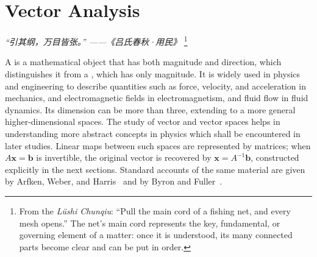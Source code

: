 \chapter{Vector Analysis}
\renewcommand{\currentchapterpath}{chapters/vec/}

\begin{flushright}
\textit{“引其纲，万目皆张。” ——《吕氏春秋·用民》}
\footnote{From the \textit{Lüshi Chunqiu}: 
``Pull the main cord of a fishing net, and every mesh opens.'' 
The net's main cord represents the key, fundamental, 
or governing element of a matter: once it is understood, 
its many connected parts become clear and can be put in order.}
\end{flushright}


A  is a mathematical object that has both magnitude and direction,
which distinguishes it from a , which has only magnitude.
It is widely used in physics and engineering to describe quantities such as
force, velocity, and acceleration in mechanics, and
electromagnetic fields in electromagnetism, and fluid flow in fluid dynamics.
Its dimension can be more than three,
extending to a more general higher-dimensional spaces. The study of
vector and vector spaces helps in understanding
more abstract concepts in physics which shall be encountered in later studies.
Linear maps between such spaces are represented by matrices; when
$A\mathbf{x}=\mathbf{b}$ is invertible, the original vector is recovered by
$\mathbf{x}=A^{-1}\mathbf{b}$, constructed explicitly in the next sections.
Standard accounts of the same material are given by Arfken, Weber, and Harris~\cite{arfken} and by Byron and Fuller~\cite{byron}.


